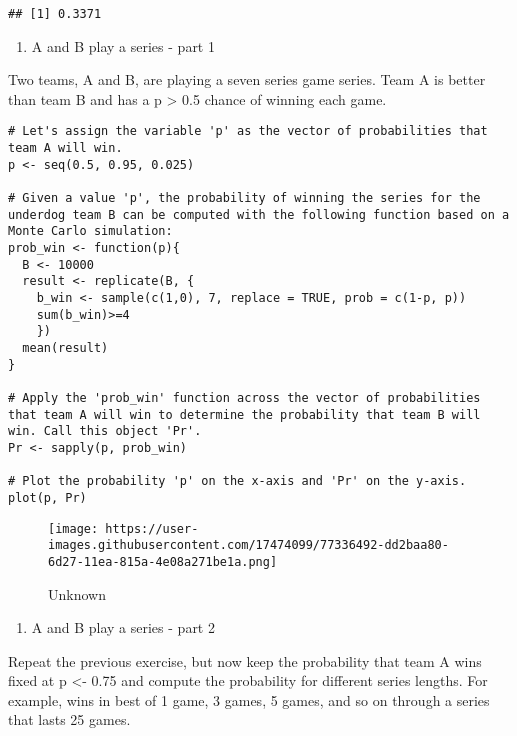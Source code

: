 \documentclass[
]{article}
\providecommand{\tightlist}{%
  \setlength{\itemsep}{0pt}\setlength{\parskip}{0pt}}
\begin{document}
\begin{verbatim}
## [1] 0.3371
\end{verbatim}

\begin{enumerate}
\def\labelenumi{\arabic{enumi}.}
\setcounter{enumi}{2}
\tightlist
\item
  A and B play a series - part 1
\end{enumerate}

Two teams, A and B, are playing a seven series game series. Team A is
better than team B and has a p \textgreater{} 0.5 chance of winning each
game.

\begin{verbatim}
# Let's assign the variable 'p' as the vector of probabilities that team A will win.
p <- seq(0.5, 0.95, 0.025)

# Given a value 'p', the probability of winning the series for the underdog team B can be computed with the following function based on a Monte Carlo simulation:
prob_win <- function(p){
  B <- 10000
  result <- replicate(B, {
    b_win <- sample(c(1,0), 7, replace = TRUE, prob = c(1-p, p))
    sum(b_win)>=4
    })
  mean(result)
}

# Apply the 'prob_win' function across the vector of probabilities that team A will win to determine the probability that team B will win. Call this object 'Pr'.
Pr <- sapply(p, prob_win)

# Plot the probability 'p' on the x-axis and 'Pr' on the y-axis.
plot(p, Pr)
\end{verbatim}

\begin{figure}
\centering
\texttt{[image: https://user-images.githubusercontent.com/17474099/77336492-dd2baa80-6d27-11ea-815a-4e08a271be1a.png]}
\caption{Unknown}
\end{figure}

\begin{enumerate}
\def\labelenumi{\arabic{enumi}.}
\setcounter{enumi}{3}
\tightlist
\item
  A and B play a series - part 2
\end{enumerate}

Repeat the previous exercise, but now keep the probability that team A
wins fixed at p \textless- 0.75 and compute the probability for
different series lengths. For example, wins in best of 1 game, 3 games,
5 games, and so on through a series that lasts 25 games.
\end{document}

